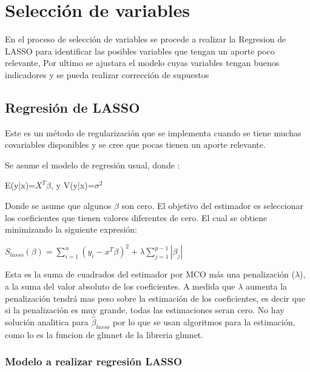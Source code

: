 \documentclass[
]{article}
\begin{document}
\hypertarget{selecciuxf3n-de-variables}{%
\section{Selección de variables}\label{selecciuxf3n-de-variables}}

En el proceso de selección de variables se procede a realizar la
Regresion de LASSO para identificar las posibles variables que tengan un
aporte poco relevante, Por ultimo se ajustara el modelo cuyas variables
tengan buenos indicadores y se pueda realizar corrección de supuestos

\hypertarget{regresiuxf3n-de-lasso}{%
\subsection{Regresión de LASSO}\label{regresiuxf3n-de-lasso}}

Este es un método de regularización que se implementa cuando se tiene
muchas covariables disponibles y se cree que pocas tienen un aporte
relevante.

Se asume el modelo de regresión usual, donde :

\begin{center}
E(y|x)=$X^T\beta$, y V(y|x)=$\sigma^2$
\end{center}

Donde se asume que algunos \(\beta\) son cero. El objetivo del estimador
es seleccionar los coeficientes que tienen valores diferentes de cero.
El cual se obtiene minimizando la siguiente expresión:

\begin{center}
$S_{lasso}(\beta)=\sum_{i=1}^{n}({y_{i}-x^
T}\beta)^2+\lambda\sum_{j=1}^{p-1}|\beta_{j}|$
\end{center}

Esta es la suma de cuadrados del estimador por MCO más una penalización
(\(\lambda\)), a la suma del valor absoluto de los coeficientes. A
medida que \(\lambda\) aumenta la penalización tendrá mas peso sobre la
estimación de los coeficientes, es decir que si la penalización es muy
grande, todas las estimaciones seran cero. No hay solución analitica
para \(\hat{\beta}_{lasso}\) por lo que se usan algoritmos para la
estimación, como lo es la funcion de glmnet de la libreria glmnet.

\hypertarget{modelo-a-realizar-regresiuxf3n-lasso}{%
\subsubsection{Modelo a realizar regresión
LASSO}\label{modelo-a-realizar-regresiuxf3n-lasso}}
\end{document}
